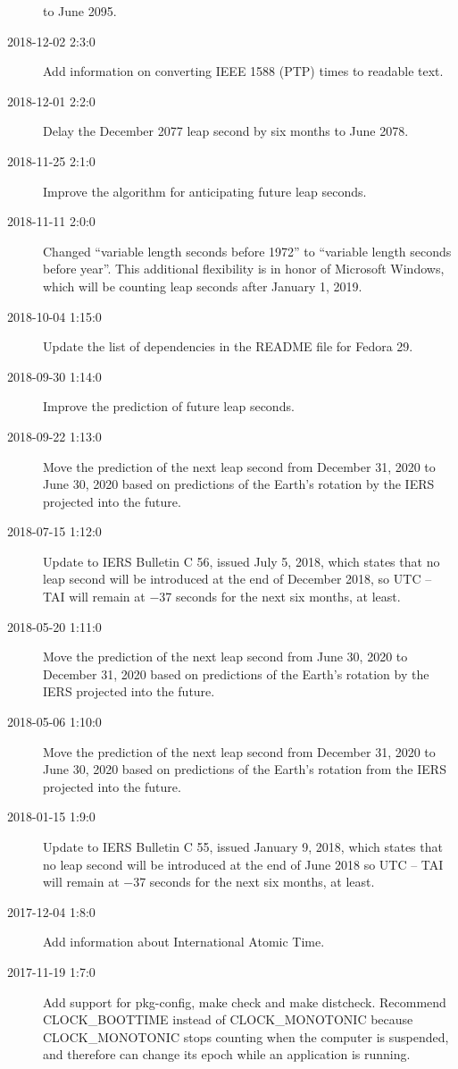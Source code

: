 \documentclass[letterpaper,twoside]{article}
\begin{document}
\begin{description}
  to June 2095.
\item[2018-12-02 2:3:0] Add information on converting IEEE 1588 (PTP)
  times to readable text.
\item[2018-12-01 2:2:0] Delay the December 2077 leap second by
  six months to June 2078.
\item[2018-11-25 2:1:0] Improve the algorithm for anticipating future
  leap seconds.
\item[2018-11-11 2:0:0] Changed ``variable length seconds before 1972''
  to ``variable length seconds before year''.  This additional flexibility
  is in honor of Microsoft Windows, which will be counting leap seconds
  after January 1, 2019.
\item[2018-10-04 1:15:0] Update the list of dependencies in the
  README file for Fedora 29.
\item[2018-09-30 1:14:0] Improve the prediction of future leap seconds.
\item[2018-09-22 1:13:0] Move the prediction of the next leap second
  from December 31, 2020 to June 30, 2020 based on predictions of
  the Earth's rotation by the IERS projected into the future.
\item[2018-07-15 1:12:0] Update to IERS Bulletin C 56, issued July
  5, 2018, which states that no leap second will be introduced
  at the end of December 2018, so UTC -- TAI will remain at
  \num{-37} seconds for the next six months, at least.
\item[2018-05-20 1:11:0] Move the prediction of the next leap second
  from June 30, 2020 to December 31, 2020 based on predictions of
  the Earth's rotation by the IERS projected into the future.
\item[2018-05-06 1:10:0] Move the prediction of the next leap second
  from December 31, 2020 to June 30, 2020 based on predictions
  of the Earth's rotation from the IERS projected into the future.
\item[2018-01-15 1:9:0] Update to IERS Bulletin C 55, issued
  January 9, 2018, which states that no leap second will be introduced
  at the end of June 2018 so UTC -- TAI will remain at \num{-37} seconds
  for the next six months, at least.
\item[2017-12-04 1:8:0] Add information about International Atomic Time.
\item[2017-11-19 1:7:0] Add support for pkg-config, make check and
  make distcheck.  Recommend CLOCK\_BOOTTIME instead of CLOCK\_MONOTONIC
  because CLOCK\_MONOTONIC stops counting when the computer is suspended,
  and therefore can change its epoch while an application is running.

\end{description}
\end{document}
